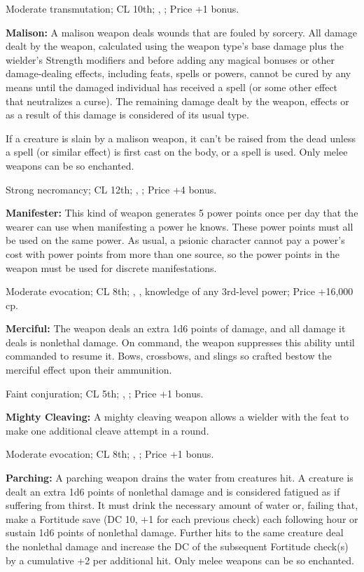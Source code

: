 Moderate transmutation; CL 10th; , ; Price +1 bonus.


\textbf{Malison:} A malison weapon deals wounds that are fouled by sorcery. All damage dealt by the weapon, calculated using the weapon type's base damage plus the wielder's Strength modifiers and before adding any magical bonuses or other damage-dealing effects, including feats, spells or powers, cannot be cured by any means until the damaged individual has received a  spell (or some other effect that neutralizes a curse). The remaining damage dealt by the weapon, effects or as a result of this damage is considered of its usual type.

If a creature is slain by a malison weapon, it can't be raised from the dead unless a  spell (or similar effect) is first cast on the body, or a  spell is used. Only melee weapons can be so enchanted.

Strong necromancy; CL 12th; , ; Price +4 bonus.


\textbf{Manifester:} This kind of weapon generates 5 power points once per day that the wearer can use when manifesting a power he knows. These power points must all be used on the same power. As usual, a psionic character cannot pay a power's cost with power points from more than one source, so the power points in the weapon must be used for discrete manifestations.

Moderate evocation; CL 8th; , , knowledge of any 3rd-level power; Price +16,000 cp.


\textbf{Merciful:} The weapon deals an extra 1d6 points of damage, and all damage it deals is nonlethal damage. On command, the weapon suppresses this ability until commanded to resume it. Bows, crossbows, and slings so crafted bestow the merciful effect upon their ammunition.

Faint conjuration; CL 5th; , ; Price +1 bonus.


\textbf{Mighty Cleaving:} A mighty cleaving weapon allows a wielder with the  feat to make one additional cleave attempt in a round.

Moderate evocation; CL 8th; , ; Price +1 bonus.


\textbf{Parching:} A parching weapon drains the water from creatures hit. A creature is dealt an extra 1d6 points of nonlethal damage and is considered fatigued as if suffering from thirst. It must drink the necessary amount of water or, failing that, make a Fortitude save (DC 10, +1 for each previous check) each following hour or sustain 1d6 points of nonlethal damage. Further hits to the same creature deal the nonlethal damage and increase the DC of the subsequent Fortitude check(s) by a cumulative +2 per additional hit. Only melee weapons can be so enchanted.

